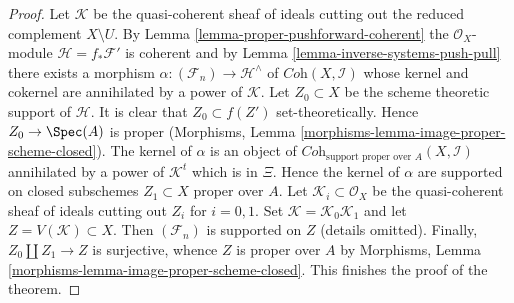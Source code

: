 \begin{proof}
\medskip\noindent
Let $\mathcal{K}$ be the quasi-coherent sheaf of ideals cutting
out the reduced complement $X \setminus U$.
By
Lemma \ref{lemma-proper-pushforward-coherent}
the $\mathcal{O}_X$-module $\mathcal{H} = f_*\mathcal{F}'$ is coherent
and by Lemma \ref{lemma-inverse-systems-push-pull}
there exists a morphism $\alpha : (\mathcal{F}_n) \to \mathcal{H}^\wedge$
of $\textit{Coh}(X, \mathcal{I})$ whose kernel and cokernel are
annihilated by a power of $\mathcal{K}$.
Let $Z_0 \subset X$ be the scheme theoretic support of $\mathcal{H}$.
It is clear that $Z_0 \subset f(Z')$ set-theoretically. Hence
$Z_0 \to \Spec(A)$ is proper
(Morphisms, Lemma \ref{morphisms-lemma-image-proper-scheme-closed}).
The kernel of $\alpha$ is an object of
$\textit{Coh}_{\text{support proper over }A}(X, \mathcal{I})$
annihilated by a power of $\mathcal{K}^t$ which is in $\Xi$.
Hence the kernel of $\alpha$ are supported on
closed subschemes $Z_1 \subset X$ proper over $A$.
Let $\mathcal{K}_i \subset \mathcal{O}_X$ be the quasi-coherent
sheaf of ideals cutting out $Z_i$ for $i = 0, 1$.
Set $\mathcal{K} = \mathcal{K}_0 \mathcal{K}_1$
and let $Z = V(\mathcal{K}) \subset X$. Then $(\mathcal{F}_n)$
is supported on $Z$ (details omitted).
Finally, $Z_0 \amalg Z_1 \to Z$ is surjective, whence $Z$
is proper over $A$ by
Morphisms, Lemma \ref{morphisms-lemma-image-proper-scheme-closed}.
This finishes the proof of the theorem.
\end{proof}

